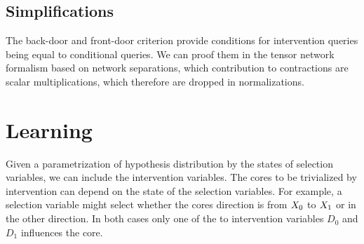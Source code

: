 \documentclass[aps,onecolumn,nofootinbib,pra]{article}
\newcommand{\dovariable}{D}
\newcommand{\dovariableof}[1]{\dovariable_{#1}}
\begin{document}
    \subsection{Simplifications}

    The back-door and front-door criterion provide conditions for intervention queries being equal to conditional queries.
    We can proof them in the tensor network formalism based on network separations, which contribution to contractions are scalar multiplications, which therefore are dropped in normalizations.


    \section{Learning}

    Given a parametrization of hypothesis distribution by the states of selection variables, we can include the intervention variables.
    The cores to be trivialized by intervention can depend on the state of the selection variables.
    For example, a selection variable might select whether the cores direction is from $X_{0}$ to $X_{1}$ or in the other direction.
    In both cases only one of the to intervention variables $\dovariableof{0}$ and $\dovariableof{1}$ influences the core.
\end{document}
